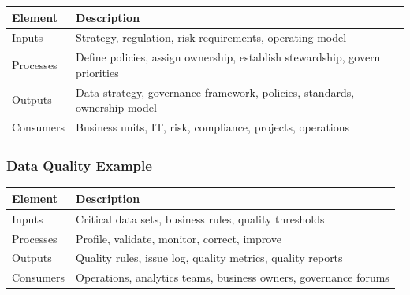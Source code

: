 \documentclass[
  letterpaper,
  DIV=11,
  numbers=noendperiod]{scrartcl}
\begin{document}
\begin{longtable}[]{@{}
  >{\raggedright\arraybackslash}p{}
  >{\raggedright\arraybackslash}p{}@{}}
\toprule\noalign{}
\begin{minipage}[b]{\linewidth}\raggedright
Element
\end{minipage} & \begin{minipage}[b]{\linewidth}\raggedright
Description
\end{minipage} \\
\midrule\noalign{}
\endhead
\bottomrule\noalign{}
\endlastfoot
Inputs & Strategy, regulation, risk requirements, operating model \\
Processes & Define policies, assign ownership, establish stewardship,
govern priorities \\
Outputs & Data strategy, governance framework, policies, standards,
ownership model \\
Consumers & Business units, IT, risk, compliance, projects,
operations \\
\end{longtable}

\subsubsection{Data Quality Example}\label{data-quality-example}

\begin{longtable}[]{@{}
  >{\raggedright\arraybackslash}p{}
  >{\raggedright\arraybackslash}p{}@{}}
\toprule\noalign{}
\begin{minipage}[b]{\linewidth}\raggedright
Element
\end{minipage} & \begin{minipage}[b]{\linewidth}\raggedright
Description
\end{minipage} \\
\midrule\noalign{}
\endhead
\bottomrule\noalign{}
\endlastfoot
Inputs & Critical data sets, business rules, quality thresholds \\
Processes & Profile, validate, monitor, correct, improve \\
Outputs & Quality rules, issue log, quality metrics, quality reports \\
Consumers & Operations, analytics teams, business owners, governance
forums \\
\end{longtable}
\end{document}
